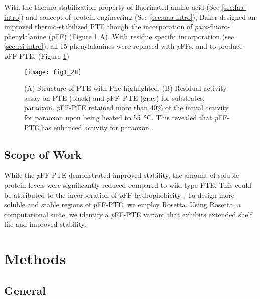 \begin{refsection}
With the thermo-stabilization property of fluorinated amino acid (See
\ref{sec:faa-intro}) and concept of protein engineering (See \ref{sec:uaa-intro}),
Baker  designed an improved thermo-stabilized PTE though the
incorporation of \emph{para}-fluoro-phenylalanine (\emph{p}FF)
\cite{Baker2011b} (Figure \ref{fig:PJB} A). With residue specific incorporation
(see \ref{sec:rsi-intro}), all 15 phenylalanines were replaced with \emph{p}FFs,
and to produce \emph{p}FF-PTE. (Figure
\ref{fig:PJB})
\begin{figure}[h!] \centering \texttt{[image: fig1\_28]}
    \caption[(A) Structure of PTE with Phe highlighted. (B) Residual activity
        assay on PTE (black) and \emph{p}FF-PTE (gray) for substrates,
        paraoxon. \emph{p}FF-PTE retained more than 40\% of the initial
        activity for paraoxon upon being heated to \SI{55}{\celsius}. This
        revealed that \emph{p}FF-PTE has enhanced activity for paraoxon.]{(A)
            Structure of PTE with Phe highlighted. (B) Residual activity assay
            on PTE (black) and \emph{p}FF--PTE (gray) for substrates, paraoxon.
            \emph{p}FF-PTE retained more than 40\% of the initial activity for
            paraoxon upon being heated to \SI{55}{\celsius}. This revealed that
            \emph{p}FF-PTE has enhanced activity for paraoxon
            \cite{Baker2011b}.} 
    \label{fig:PJB} 
\end{figure}

\subsection{Scope of Work}

While the \emph{p}FF-PTE demonstrated improved stability, the amount of soluble
protein levels were significantly reduced compared to wild-type PTE. This could
be attributed to the incorporation of \emph{p}FF hydrophobicity
\cite{Baker2011b}. To design more soluble and stable regions of \emph{p}FF-PTE,
we employ Rosetta. Using Rosetta, a computational suite, we identify a
\emph{p}FF-PTE variant that exhibits extended shelf life and improved
stability. 

\section{Methods}

\subsection{General}


\end{refsection}
